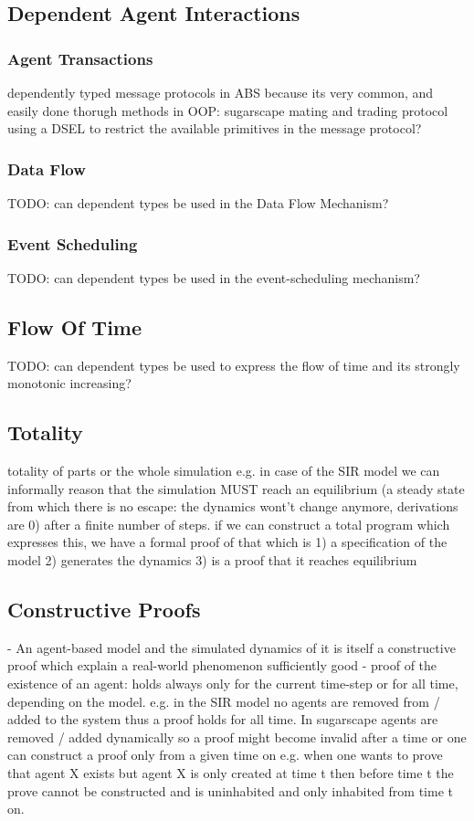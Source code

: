 \subsection{Dependent Agent Interactions}
\subsubsection{Agent Transactions}
dependently typed message protocols in ABS because its very common, and easily done thorugh methods in OOP: sugarscape mating and trading protocol
using a DSEL \cite{brady_correct-by-construction_2010} to restrict the available primitives in the message protocol?

\subsubsection{Data Flow}
TODO: can dependent types be used in the Data Flow Mechanism?
\subsubsection{Event Scheduling}
TODO: can dependent types be used in the event-scheduling mechanism?

\subsection{Flow Of Time}
TODO: can dependent types be used to express the flow of time and its strongly monotonic increasing?

\subsection{Totality}
totality of parts or the whole simulation e.g. in case of the SIR model we can informally reason that the simulation MUST reach an equilibrium (a steady state from which there is no escape: the dynamics wont't change anymore, derivations are 0) after a finite number of steps. if we can construct a total program which expresses this, we have a formal proof of that which is 1) a specification of the model 2) generates the dynamics 3) is a proof that it reaches equilibrium

\subsection{Constructive Proofs}
- An agent-based model and the simulated dynamics of it is itself a constructive proof which explain a real-world phenomenon sufficiently good
- proof of the existence of an agent: holds always only for the current time-step or for all time, depending on the model. e.g. in the SIR model no agents are removed from / added to the system thus a proof holds for all time. In sugarscape agents are removed / added dynamically so a proof might become invalid after a time or one can construct a proof only from a given time on e.g. when one wants to prove that agent X exists but agent X is only created at time t then before time t the prove cannot be constructed and is uninhabited and only inhabited from time t on.

